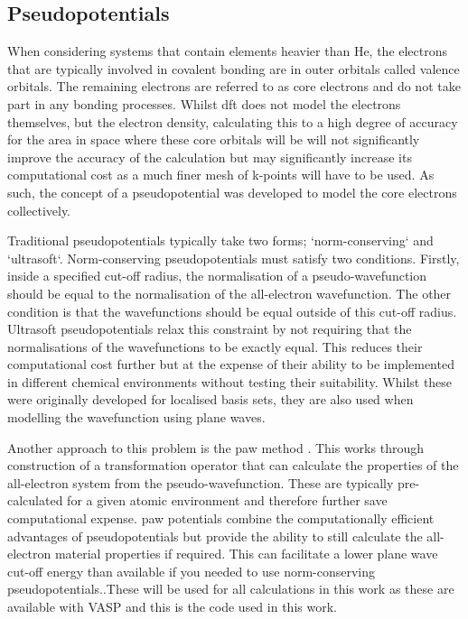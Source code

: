 \subsection{Pseudopotentials}
\label{subsec:pseudopot}
When considering systems that contain elements heavier than He, the electrons that are typically involved in covalent bonding are in outer orbitals called valence orbitals. The remaining electrons are referred to as core electrons and do not take part in any bonding processes. Whilst \acrshort{dft} does not model the electrons themselves, but the electron density, calculating this to a high degree of accuracy for the area in space where these core orbitals will be will not significantly improve the accuracy of the calculation but may significantly increase its computational cost as a much finer mesh of k\nobreakdash-points will have to be used. As such, the concept of a pseudopotential was developed to model the core electrons collectively.

Traditional pseudopotentials typically take two forms; `norm\nobreakdash-conserving` and `ultrasoft`. Norm\nobreakdash-conserving pseudopotentials \cite{Hamann1979} must satisfy two conditions. Firstly, inside a specified cut\nobreakdash-off radius, the normalisation of a pseudo\nobreakdash-wavefunction should be equal to the normalisation of the all\nobreakdash-electron wavefunction. The other condition is that the wavefunctions should be equal outside of this cut\nobreakdash-off radius. Ultrasoft pseudopotentials \cite{Vanderbilt1990} relax this constraint by not requiring that the normalisations of the wavefunctions to be exactly equal. This reduces their computational cost further but at the expense of their ability to be implemented in different chemical environments without testing their suitability. Whilst these were originally developed for localised basis sets, they are also used when modelling the wavefunction using plane waves.

Another approach to this problem is the \acrfull{paw} method \cite{Blochl1994}. This works through construction of a transformation operator that can calculate the properties of the all\nobreakdash-electron system from the pseudo\nobreakdash-wavefunction. These are typically pre\nobreakdash-calculated for a given atomic environment and therefore further save computational expense. \acrshort{paw} potentials combine the computationally efficient advantages of pseudopotentials but provide the ability to still calculate the all\nobreakdash-electron material properties if required. This can facilitate a lower plane wave cut\nobreakdash-off energy than available if you needed to use norm\nobreakdash-conserving pseudopotentials..These will be used for all calculations in this work as these are available with VASP \cite{Hafner2008} and this is the code used in this work.

